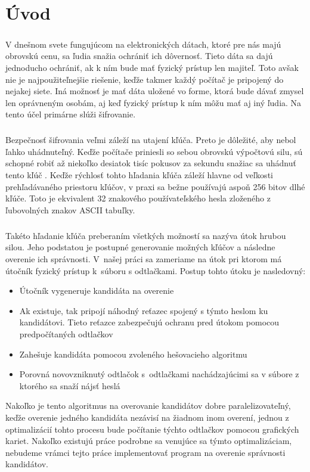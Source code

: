 \chapter*{Úvod}
\paragraph{}
V dnešnom svete fungujúcom na elektronických dátach, ktoré pre nás majú obrovskú cenu, sa ľudia snažia ochrániť ich dôvernosť. Tieto dáta sa dajú jednoducho ochrániť, ak k ním bude mať fyzický prístup len majiteľ. Toto avšak nie je najpoužiteľnejšie riešenie, keďže takmer každý počítač je pripojený do nejakej siete. Iná možnosť je mať dáta uložené vo forme, ktorá bude dávať zmysel len oprávneným osobám, aj keď fyzický prístup k ním môžu mať aj iný ľudia. Na tento účel primárne slúži šifrovanie. 

\paragraph{}
Bezpečnosť šifrovania veľmi záleží na utajení kľúča. Preto je dôležité, aby nebol ľahko uhádnuteľný. Keďže počítače priniesli so sebou obrovskú výpočtovú silu, sú schopné robiť až niekoľko desiatok tisíc pokusov za sekundu snažiac sa uhádnuť tento kľúč \cite{gpu25}. Keďže rýchlosť tohto hľadania kľúča záleží hlavne od veľkosti prehľadávaného priestoru kľúčov, v praxi sa bežne používajú aspoň 256 bitov dlhé kľúče. Toto je ekvivalent 32 znakového používateľského hesla zloženého z ľubovolných znakov ASCII tabuľky.

\paragraph{}
Takéto hľadanie kľúča preberaním všetkých možností sa nazýva útok hrubou silou. Jeho podstatou je postupné generovanie možných kľúčov a následne overenie ich správnosti. V~našej práci sa zameriame na útok pri ktorom má útočník fyzický prístup k~súboru s odtlačkami. Postup tohto útoku je nasledovný:
\begin{itemize}
	\item Útočník vygeneruje kandidáta na overenie
	\item Ak existuje, tak pripojí náhodný reťazec spojený s týmto heslom ku kandidátovi. Tieto reťazce zabezpečujú ochranu pred útokom pomocou predpočítaných odtlačkov
	\item Zahešuje kandidáta pomocou zvoleného hešovacieho algoritmu
	\item Porovná novovzniknutý odtlačok s~odtlačkami nachádzajúcimi sa v súbore z ktorého sa snaží nájsť heslá
\end{itemize}
Nakoľko je tento algoritmus na overovanie kandidátov dobre paralelizovateľný, keďže overenie jedného kandidáta nezávisí na žiadnom inom overení, jednou z optimalizácií tohto procesu bude počítanie týchto odtlačkov pomocou grafických kariet. Nakoľko existujú práce \cite{5665047} podrobne sa venujúce sa týmto optimalizáciam, nebudeme vrámci tejto práce implementovať program na overenie správnosti kandidátov. 

